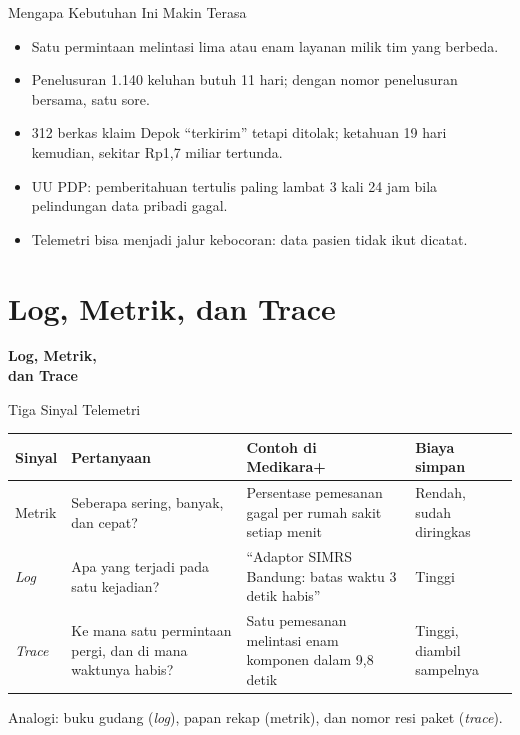 \documentclass[aspectratio=169, table, 12pt]{beamer}
\begin{document}
\begin{frame}{{\Large Mengapa Kebutuhan Ini Makin Terasa}}
  \vspace{6pt}
  \small
  \begin{itemize}
    \item Satu permintaan melintasi lima atau enam layanan milik tim yang berbeda.
    \item Penelusuran 1.140 keluhan butuh 11 hari; dengan nomor penelusuran bersama,
          satu sore.
    \item 312 berkas klaim Depok ``terkirim'' tetapi ditolak; ketahuan 19 hari kemudian,
          sekitar Rp1,7 miliar tertunda.
    \item UU PDP: pemberitahuan tertulis paling lambat 3 kali 24 jam bila pelindungan
          data pribadi gagal.
    \item Telemetri bisa menjadi jalur kebocoran: data pasien tidak ikut dicatat.
  \end{itemize}
\end{frame}

\section{Log, Metrik, dan Trace}

\begin{frame}{\hfill}
  \centering
  \Huge{\textbf{Log, Metrik,\\dan Trace}}
\end{frame}

\begin{frame}{{\Large Tiga Sinyal Telemetri}}
  \footnotesize
  \begin{tabularx}{\textwidth}{>{\raggedright\arraybackslash}p{1.5cm}
      >{\raggedright\arraybackslash}X >{\raggedright\arraybackslash}X
      >{\raggedright\arraybackslash}p{2.6cm}}
    \hline
    \textbf{Sinyal} & \textbf{Pertanyaan} & \textbf{Contoh di Medikara+} &
      \textbf{Biaya simpan} \\
    \hline
    Metrik & Seberapa sering, banyak, dan cepat? & Persentase pemesanan gagal per rumah
      sakit setiap menit & Rendah, sudah diringkas \\
    \hline
    \textit{Log} & Apa yang terjadi pada satu kejadian? & ``Adaptor SIMRS Bandung: batas
      waktu 3 detik habis'' & Tinggi \\
    \hline
    \textit{Trace} & Ke mana satu permintaan pergi, dan di mana waktunya habis? & Satu
      pemesanan melintasi enam komponen dalam 9,8 detik & Tinggi, diambil sampelnya \\
    \hline
  \end{tabularx}

  \vspace{10pt}
  \small
  Analogi: buku gudang (\textit{log}), papan rekap (metrik), dan nomor resi paket
  (\textit{trace}).
\end{frame}
\end{document}
